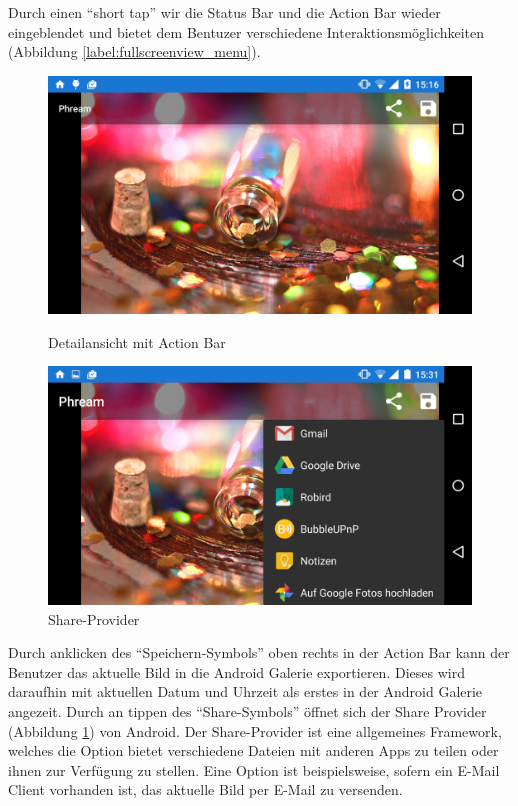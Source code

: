 Durch einen \enquote{short tap} wir die Status Bar und die Action Bar wieder eingeblendet und bietet dem Bentuzer verschiedene Interaktionsmöglichkeiten (Abbildung \ref{label:fullscreenview_menu}).

\begin{figure}[H]
\centering
	\begin{minipage}{0.4\textwidth} 
	\centering
	\includegraphics[width=1\textwidth]{images/screenshots/fullscreenview_menu.png}
	\caption{Detailansicht mit Action Bar}
	\label{label:fullscreenview_menu}
	\end{minipage}
	\hfill
	\begin{minipage}{0.4\textwidth}
	\centering
	\includegraphics[width=1\textwidth]{images/screenshots/fullscreenview_share.png}
	\caption{Share-Provider}
	\label{label:fullscreenview_share}
	\end{minipage}
\end{figure}

Durch anklicken des \enquote{Speichern-Symbols} oben rechts in der Action Bar kann der Benutzer das aktuelle Bild in die Android Galerie exportieren. Dieses wird daraufhin mit aktuellen Datum und Uhrzeit als erstes in der Android Galerie angezeit. Durch an tippen des \enquote{Share-Symbols} öffnet sich der Share Provider (Abbildung \ref{label:fullscreenview_share}) von Android. Der Share-Provider ist eine allgemeines Framework, welches die Option bietet verschiedene Dateien mit anderen Apps zu teilen oder ihnen zur Verfügung zu stellen. Eine Option ist beispielsweise, sofern ein E-Mail Client vorhanden ist, das aktuelle Bild per E-Mail zu versenden.

